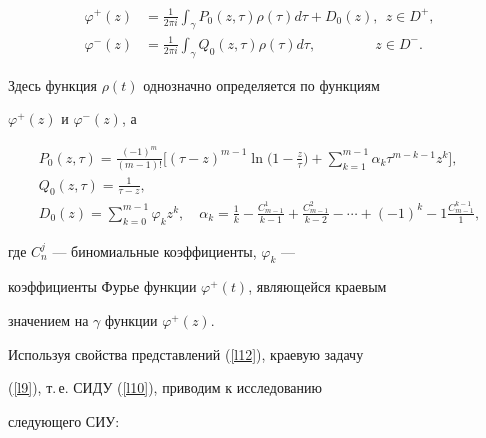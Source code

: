 \begin{equation} %


\label{l12}


\begin{split}


\varphi^+(z)&=\frac{1}{2\pi i}


\int_\gamma P_0(z,\tau)\rho(\tau) d\tau + D_0(z),\ \  z \in D^+, \\


\varphi^-(z)&=\frac{1}{2\pi i}


\int_\gamma Q_0(z,\tau)\rho(\tau) d\tau,\ \qquad\qquad z \in D^-.


\end{split}


\end{equation}


Здесь функция $\rho(t)$ однозначно определяется по функциям


$\varphi^+(z)$ и $\varphi^-(z)$, а


\begin{gather*}


P_0(z,\tau)=\frac{(-1)^m}{(m-1)!}


\bigg[(\tau-z)^{m-1} \ln\bigg( 1-\frac{z}{\tau} \bigg)+


\sum_{k=1}^{m-1} \alpha_k \tau^{m-k-1} z^k\bigg],\\


%


Q_0(z,\tau)=\frac{1}{\tau-z},\\


%


D_0(z)=\sum_{k=0}^{m-1}\varphi_k z^k,\quad


\alpha_k=\frac{1}{k}-\frac{C_{m-1}^1}{k-1}


+\frac{C_{m-1}^2}{k-2}-\dotsb+(-1)^k-1\frac{C_{m-1}^{k-1}}{1},


\end{gather*}


где $C_n^j$ --- биномиальные коэффициенты, $\varphi_k$ ---


коэффициенты Фурье функции $\varphi^+(t)$, являющейся краевым


значением на $\gamma$ функции $\varphi^+(z)$.





Используя свойства представлений (\ref{l12}), краевую задачу


(\ref{l9}), т.\,е. СИДУ (\ref{l10}), приводим к исследованию


следующего СИУ:


